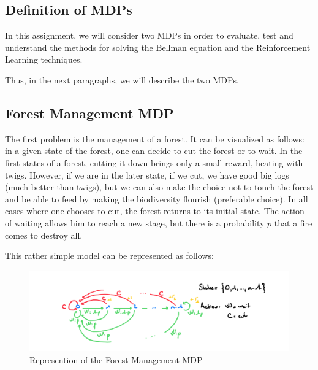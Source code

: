 \documentclass[11pt]{article}
\begin{document}
\begin{multicols}{2}

\section{Definition of MDPs}

In this assignment, we will consider two MDPs in order to evaluate, test and understand the methods for solving the Bellman equation and the Reinforcement Learning techniques. 

Thus, in the next paragraphs, we will describe the two MDPs.

\subsection{Forest Management MDP}

The first problem is the management of a forest. It can be visualized as follows: in a given state of the forest, one can decide to cut the forest or to wait. In the first states of a forest, cutting it down brings only a small reward, heating with twigs. However, if we are in the later state, if we cut, we have good big logs (much better than twigs), but we can also make the choice not to touch the forest and be able to feed by making the biodiversity flourish (preferable choice). In all cases where one chooses to cut, the forest returns to its initial state. The action of waiting allows him to reach a new stage, but there is a probability $p$ that a fire comes to destroy all.

This rather simple model can be represented as follows:

\begin{figure}[H]
\centering
\includegraphics[width = \columnwidth]{mdp_fm.png}
\caption{Represention of the Forest Management MDP}
\end{figure}


\end{multicols}
\end{document}

